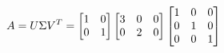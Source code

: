 \documentclass[preview]{standalone}
\begin{document}
\begin{align*}
\special{dvisvgm:raw <g id='unique000'>}A = U \Sigma V^T = \begin{bmatrix}1 & 0\\0 & 1\end{bmatrix}\begin{bmatrix}3 & 0 & 0\\0 & 2 & 0\end{bmatrix}\begin{bmatrix}1 & 0 & 0\\0 & 1 & 0\\0 & 0 & 1\end{bmatrix}\special{dvisvgm:raw </g>}
\end{align*}
\end{document}
